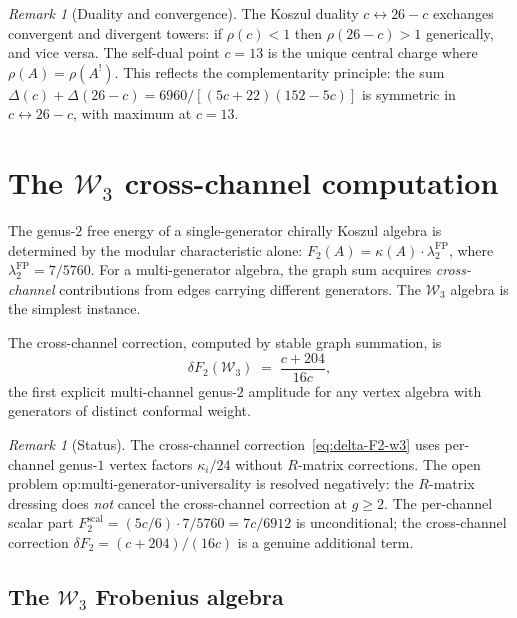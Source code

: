 \documentclass[11pt]{article}
\theoremstyle{plain}
\theoremstyle{definition}
\theoremstyle{remark}
\newtheorem{remark}[theorem]{Remark}
\newcommand{\cW}{\mathcal{W}}
\begin{document}
\begin{remark}[Duality and convergence]
\label{rem:duality-convergence}
The Koszul duality $c \leftrightarrow 26-c$ exchanges
convergent and divergent towers: if $\rho(c) < 1$ then
$\rho(26-c) > 1$ generically, and vice versa. The
self-dual point $c = 13$ is the unique central charge where
$\rho(A) = \rho(A^{!})$. This reflects the complementarity
principle: the sum
$\Delta(c) + \Delta(26-c) = 6960/[(5c+22)(152-5c)]$
is symmetric in $c \leftrightarrow 26-c$, with maximum at
$c = 13$.
\end{remark}

\section{The \texorpdfstring{$\cW_3$}{W3} cross-channel computation}
\label{sec:genus2}

The genus-$2$ free energy of a single-generator chirally Koszul
algebra is determined by the modular characteristic alone:
$F_2(A) = \kappa(A) \cdot \lambda_2^{\mathrm{FP}}$, where
$\lambda_2^{\mathrm{FP}} = 7/5760$. For a multi-generator
algebra, the graph sum acquires \emph{cross-channel} contributions
from edges carrying different generators. The $\cW_3$ algebra
is the simplest instance.

The cross-channel correction, computed by stable graph summation, is
\begin{equation}\label{eq:delta-F2-w3}
 \delta F_2(\cW_3)
 \;=\;
 \frac{c + 204}{16c},
\end{equation}
the first explicit multi-channel genus-$2$ amplitude for any
vertex algebra with generators of distinct conformal weight.

\begin{remark}[Status]
\label{rem:cross-channel-status}
The cross-channel correction~\eqref{eq:delta-F2-w3} uses
per-channel genus-$1$ vertex factors $\kappa_i/24$ without
$R$-matrix corrections. The open problem
\textup{op:multi-generator-universality} is resolved negatively:
the $R$-matrix dressing does \emph{not} cancel the cross-channel
correction at $g \geq 2$. The per-channel scalar part
$F_2^{\mathrm{scal}} = (5c/6) \cdot 7/5760 = 7c/6912$ is
unconditional; the cross-channel correction
$\delta F_2 = (c{+}204)/(16c)$ is a genuine additional term.
\end{remark}


\subsection{The $\cW_3$ Frobenius algebra}
\end{document}
